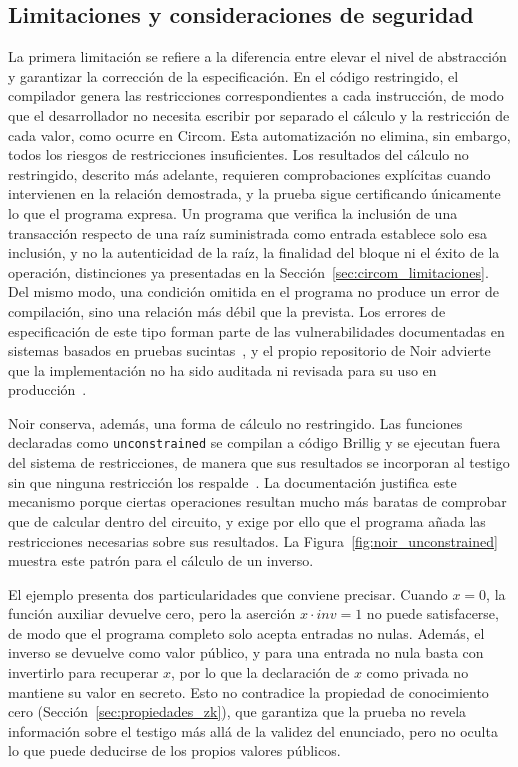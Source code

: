 \subsection{Limitaciones y consideraciones de seguridad}
\label{sec:noir_limitaciones}

La primera limitación se refiere a la diferencia entre elevar el nivel de abstracción y
garantizar la corrección de la especificación. En el código restringido, el compilador genera
las restricciones correspondientes a cada instrucción, de modo que el desarrollador no necesita
escribir por separado el cálculo y la restricción de cada valor, como ocurre en Circom. Esta
automatización no elimina, sin embargo, todos los riesgos de restricciones insuficientes. Los
resultados del cálculo no restringido, descrito más adelante, requieren comprobaciones explícitas
cuando intervienen en la relación demostrada, y la prueba sigue certificando únicamente lo que el
programa expresa. Un programa que verifica la inclusión de una transacción respecto de una raíz
suministrada como entrada establece solo esa inclusión, y no la autenticidad de la raíz, la
finalidad del bloque ni el éxito de la operación, distinciones ya presentadas en la
Sección~\ref{sec:circom_limitaciones}. Del mismo modo, una condición omitida en el programa no
produce un error de compilación, sino una relación más débil que la prevista. Los errores de
especificación de este tipo forman parte de las vulnerabilidades documentadas en sistemas basados
en pruebas sucintas~\cite{chaliasos2024sok}, y el propio repositorio de Noir advierte que la
implementación no ha sido auditada ni revisada para su uso en producción~\cite{noirrepo}.

Noir conserva, además, una forma de cálculo no restringido. Las funciones declaradas como
\lstinline|unconstrained| se compilan a código Brillig y se ejecutan fuera del sistema de
restricciones, de manera que sus resultados se incorporan al testigo sin que ninguna restricción
los respalde~\cite{noirdocsbeta}. La documentación justifica este mecanismo porque ciertas
operaciones resultan mucho más baratas de comprobar que de calcular dentro del circuito, y exige
por ello que el programa añada las restricciones necesarias sobre sus resultados. La
Figura~\ref{fig:noir_unconstrained} muestra este patrón para el cálculo de un inverso.

El ejemplo presenta dos particularidades que conviene precisar. Cuando $x = 0$, la función
auxiliar devuelve cero, pero la aserción $x \cdot \mathit{inv} = 1$ no puede satisfacerse, de modo
que el programa completo solo acepta entradas no nulas. Además, el inverso se devuelve como valor
público, y para una entrada no nula basta con invertirlo para recuperar $x$, por lo que la
declaración de $x$ como privada no mantiene su valor en secreto. Esto no contradice la propiedad
de conocimiento cero (Sección~\ref{sec:propiedades_zk}), que garantiza que la prueba no revela
información sobre el testigo más allá de la validez del enunciado, pero no oculta lo que puede
deducirse de los propios valores públicos.

